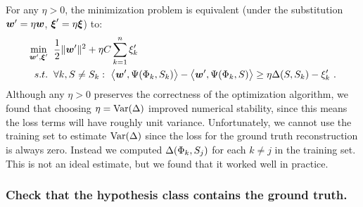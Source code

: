 For any $\eta>0$, the minimization problem  is
equivalent (under the substitution $\Model'=\eta\Model$,
$\Slacks'=\eta\Slacks$) to:
\begin{equation}
  \begin{split}
    \min_{\Model',\Slacks'} &
      \hspace{2mm} 
    \frac{1}{2} \|\Model'\|^2 +
      \eta C \sum_{k=1}^n \Slack_k'\\
    s.t. & \hspace{2mm} \forall k, \Seam \neq \Seam_k:~
      \bigl\langle\Model', \JointFtr(\Features_k,\Seam_k)\bigr\rangle -
      \bigl\langle\Model', \JointFtr(\Features_k,\Seam)\bigr\rangle
      \geq
      \eta \Loss(\Seam,\Seam_k) - \Slack_k' ~.
  \end{split}
  \label{eq:equiv-problem}
\end{equation}
Although any $\eta>0$ preserves the correctness of the optimization
algorithm, we found that choosing $\eta=\mbox{Var}(\Loss)$ improved
numerical stability, since this means the loss terms will have roughly
unit variance. Unfortunately, we cannot use the training set to
estimate $\mbox{Var}(\Loss)$ since the loss for the ground truth
reconstruction is always zero. Instead we computed
$\Loss(\Features_k,\Seam_j)$ for each $k \neq j$ in the training
set. This is not an ideal estimate, but we found that it worked well
in practice.

\subsubsection{Check that the hypothesis class contains the ground
  truth.}

